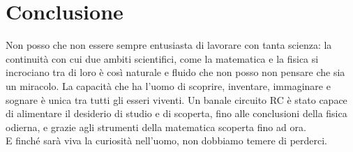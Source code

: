 \documentclass[a3paper, twoside, openany]{book}
\theoremstyle{definition}
\begin{document}
\section{Conclusione}
Non posso che non essere sempre entusiasta di lavorare con tanta scienza: la continuità con cui due ambiti scientifici, come la matematica e la fisica si incrociano tra di loro è così naturale e fluido che non posso non pensare che sia un miracolo. La capacità che ha l'uomo di scoprire, inventare, immaginare e sognare è unica tra tutti gli esseri viventi. Un banale circuito RC è stato capace di alimentare il desiderio di studio e di scoperta, fino alle conclusioni della fisica odierna, e grazie agli strumenti della matematica scoperta fino ad ora. \\ E finché sarà viva la curiosità nell'uomo, non dobbiamo temere di perderci.
\end{document}
